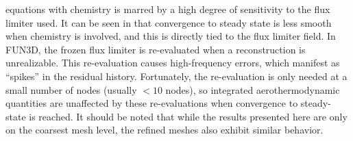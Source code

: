 equations with chemistry is marred by a high degree of sensitivity to the flux
limiter used.  It can be seen in  that convergence to
steady state is less smooth when chemistry is involved, and this is directly
tied to the flux limiter field.  In FUN3D, the frozen flux limiter is
re-evaluated when a reconstruction is unrealizable.  This re-evaluation causes
high-frequency errors, which manifest as ``spikes'' in the residual history.
Fortunately, the re-evaluation is only needed at a small number of nodes
(usually $< 10$ nodes), so integrated aerothermodynamic quantities are
unaffected by these re-evaluations when convergence to steady-state is reached.
It should be noted that while the results presented here are only on the
coarsest mesh level, the refined meshes also exhibit similar behavior.

